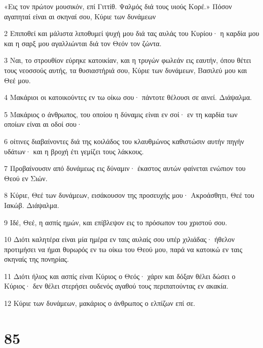 \par «Εις τον πρώτον μουσικόν, επί Γιττίθ. Ψαλμός διά τους υιούς Κορέ.» Πόσον αγαπηταί είναι αι σκηναί σου, Κύριε των δυνάμεων
\par 2 Επιποθεί και μάλιστα λιποθυμεί ψυχή μου διά τας αυλάς του Κυρίου· η καρδία μου και η σαρξ μου αγαλλιώνται διά τον Θεόν τον ζώντα.
\par 3 Ναι, το στρουθίον εύρηκε κατοικίαν, και η τρυγών φωλεάν εις εαυτήν, όπου θέτει τους νεοσσούς αυτής, τα θυσιαστήριά σου, Κύριε των δυνάμεων, Βασιλεύ μου και Θεέ μου.
\par 4 Μακάριοι οι κατοικούντες εν τω οίκω σου· πάντοτε θέλουσι σε αινεί. Διάψαλμα.
\par 5 Μακάριος ο άνθρωπος, του οποίου η δύναμις είναι εν σοί· εν τη καρδία των οποίων είναι αι οδοί σου·
\par 6 οίτινες διαβαίνοντες διά της κοιλάδος του κλαυθμώνος καθιστώσιν αυτήν πηγήν υδάτων· και η βροχή έτι γεμίζει τους λάκκους.
\par 7 Προβαίνουσιν από δυνάμεως εις δύναμιν· έκαστος αυτών φαίνεται ενώπιον του Θεού εν Σιών.
\par 8 Κύριε, Θεέ των δυνάμεων, εισάκουσον της προσευχής μου· Ακροάσθητι, Θεέ του Ιακώβ. Διάψαλμα.
\par 9 Ιδέ, Θεέ, η ασπίς ημών, και επίβλεψον εις το πρόσωπον του χριστού σου.
\par 10 Διότι καλητέρα είναι μία ημέρα εν ταις αυλαίς σου υπέρ χιλιάδας· ήθελον προτιμήσει να ήμαι θυρωρός εν τω οίκω του Θεού μου, παρά να κατοικώ εν ταις σκηναίς της πονηρίας.
\par 11 Διότι ήλιος και ασπίς είναι Κύριος ο Θεός· χάριν και δόξαν θέλει δώσει ο Κύριος· δεν θέλει στερήσει ουδενός αγαθού τους περιπατούντας εν ακακία.
\par 12 Κύριε των δυνάμεων, μακάριος ο άνθρωπος ο ελπίζων επί σε.

\chapter{85}

